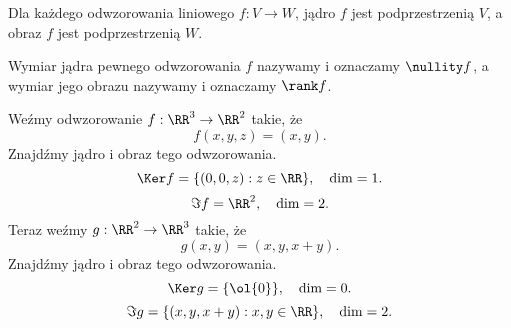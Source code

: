 \begin{fact}
    Dla każdego odwzorowania liniowego $f : V \to W$, jądro $f$ jest podprzestrzenią $V$, a obraz $f$ jest podprzestrzenią $W$.
\end{fact}

Wymiar jądra pewnego odwzorowania $f$ nazywamy  i oznaczamy $\nullity f$, a wymiar jego obrazu nazywamy  i oznaczamy $\rank f$.

\begin{example}
    Weźmy odwzorowanie $f : \RR^3 \to \RR^2$ takie, że
    \[ f(x, y, z) = (x, y). \]
    Znajdźmy jądro i obraz tego odwzorowania.
    \[ \Ker f = \{(0, 0, z) : z \in \RR\}, \quad \dim = 1. \]
    \[ \Im f = \RR^2, \quad \dim = 2. \]
    Teraz weźmy $g : \RR^2 \to \RR^3$ takie, że
    \[ g(x, y) = (x, y, x + y). \]
    Znajdźmy jądro i obraz tego odwzorowania.
    \[ \Ker g = \{\ol{0}\}, \quad \dim = 0. \]
    \[ \Im g = \{(x, y, x+y) : x, y \in \RR\}, \quad \dim = 2. \]
\end{example}

